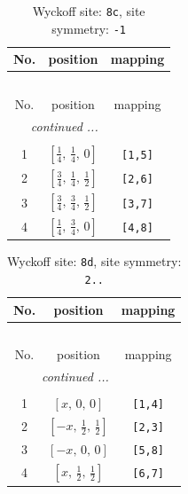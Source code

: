 \documentclass[fleqn,8pt]{jsarticle}
\begin{document}
\renewcommand{\arraystretch}{1.2}
\begin{longtable}{ccc}
\caption{Wyckoff site: {\tt 8c}, site symmetry: {\tt -1}}
 \\
 \hline \hline
No. & position & mapping \\ \hline \endfirsthead

\multicolumn{2}{l}{\tablename\ \thetable{}} \\
 \hline \hline
No. & position & mapping \\ \hline \endhead

 \hline \hline
\multicolumn{2}{r}{\footnotesize\it continued ...} \\ \endfoot

 \hline \hline
\multicolumn{2}{r}{} \\ \endlastfoot

1 & $\left[ \frac{1}{4},\, \frac{1}{4},\, 0 \right]$ & {\tt [1,5]} \\ \hline
2 & $\left[ \frac{3}{4},\, \frac{1}{4},\, \frac{1}{2} \right]$ & {\tt [2,6]} \\ \hline
3 & $\left[ \frac{3}{4},\, \frac{3}{4},\, \frac{1}{2} \right]$ & {\tt [3,7]} \\ \hline
4 & $\left[ \frac{1}{4},\, \frac{3}{4},\, 0 \right]$ & {\tt [4,8]} \\
\end{longtable}
\renewcommand{\arraystretch}{1.2}
\begin{longtable}{ccc}
\caption{Wyckoff site: {\tt 8d}, site symmetry: {\tt 2..}}
 \\
 \hline \hline
No. & position & mapping \\ \hline \endfirsthead

\multicolumn{2}{l}{\tablename\ \thetable{}} \\
 \hline \hline
No. & position & mapping \\ \hline \endhead

 \hline \hline
\multicolumn{2}{r}{\footnotesize\it continued ...} \\ \endfoot

 \hline \hline
\multicolumn{2}{r}{} \\ \endlastfoot

1 & $\left[ x,\, 0,\, 0 \right]$ & {\tt [1,4]} \\ \hline
2 & $\left[ - x,\, \frac{1}{2},\, \frac{1}{2} \right]$ & {\tt [2,3]} \\ \hline
3 & $\left[ - x,\, 0,\, 0 \right]$ & {\tt [5,8]} \\ \hline
4 & $\left[ x,\, \frac{1}{2},\, \frac{1}{2} \right]$ & {\tt [6,7]} \\
\end{longtable}
\end{document}
